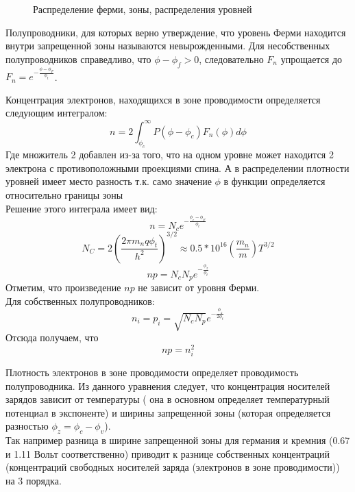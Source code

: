 \begin{center}
	\begin{figure}[H]
		\caption{Распределение ферми, зоны, распределения уровней}	
  		\label{img:fermi}
	\end{figure}
\end{center}	


Полупроводники, для которых верно утверждение, что уровень Ферми находится внутри запрещенной зоны называются невырожденными. Для несобственных полупроводников справедливо, что $\phi - \phi_f > 0$, следовательно $F_n$ упрощается до $F_n = e^{-\frac{\phi - \phi_F}{\phi_t}}$. 


Концентрация электронов, находящихся в зоне проводимости определяется следующим интегралом:
\begin{equation}
n = 2 \int_{\phi_c}^{\infty} P(\phi - \phi_c) F_n(\phi) d\phi
\end{equation}
Где множитель 2 добавлен из-за того, что на одном уровне может находится 2 электрона с противоположными проекциями спина. А в распределении плотности уровней имеет место разность т.к. само значение $\phi$ в функции определяется относительно границы зоны\\

Решение этого интеграла имеет вид:
\begin{equation}
n = N_c  e^{-\frac{\phi_c - \phi_F}{\phi_t}}
\end{equation}
\begin{equation}
N_C = 2 (\frac{2 \pi m_n q  \phi_t }{h^2})^{3/2} \approx 0.5 * 10^{16} (\frac{m_n}{m}) T^{3/2} 
\end{equation}
\begin{equation}
np = N_c N_p e^{-\frac{\phi_z}{\phi_t}}
\end{equation}
Отметим, что произведение $np$ не зависит от уровня Ферми.\\
Для собственных полупроводников:
\begin{equation}
n_i = p_i = \sqrt{N_c N_p} e^{-\frac{\phi_z}{2 \phi_t}}
\end{equation}
Отсюда получаем, что 
\begin{equation}
np = n_i^2
\end{equation}

Плотность электронов в зоне проводимости определяет проводимость полупроводника.
Из данного уравнения следует, что концентрация носителей зарядов зависит от температуры ( она в основном определяет температурный потенциал в экспоненте) и ширины запрещенной зоны (которая определяется разностью $\phi_z = \phi_c - \phi_v$).  \\
Так например разница в ширине запрещенной зоны для германия и кремния (0.67 и 1.11 Вольт соответственно) приводит к разнице собственных концентраций (концентраций свободных носителей заряда (электронов в зоне проводимости)) на 3 порядка.

